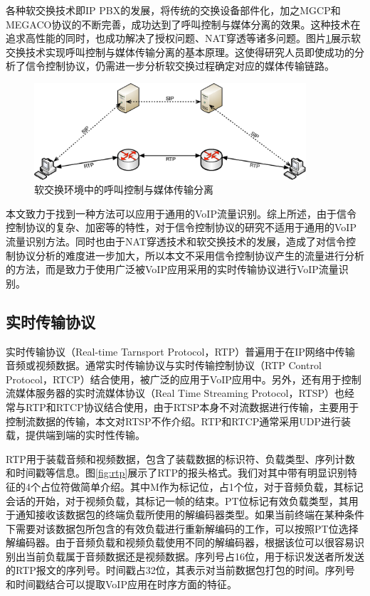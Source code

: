 各种软交换技术即IP PBX的发展，将传统的交换设备部件化，加之MGCP和MEGACO协议的不断完善，成功达到了呼叫控制与媒体分离的效果。这种技术在追求高性能的同时，也成功解决了授权问题、NAT穿透等诸多问题。图片\ref{fig:softswitch}展示软交换技术实现呼叫控制与媒体传输分离的基本原理。这使得研究人员即使成功的分析了信令控制协议，仍需进一步分析软交换过程确定对应的媒体传输链路。
\begin{figure}[thb]
\begin{center}
\includegraphics[width=0.9\textwidth]{figures/softswitch.eps}
\caption{软交换环境中的呼叫控制与媒体传输分离}\label{fig:softswitch}
\end{center}
\end{figure}

本文致力于找到一种方法可以应用于通用的VoIP流量识别。综上所述，由于信令控制协议的复杂、加密等的特性，对于信令控制协议的研究不适用于通用的VoIP流量识别方法。同时也由于NAT穿透技术和软交换技术的发展，造成了对信令控制协议分析的难度进一步加大，所以本文不采用信令控制协议产生的流量进行分析的方法，而是致力于使用广泛被VoIP应用采用的实时传输协议进行VoIP流量识别。

\subsection{实时传输协议}
实时传输协议（Real-time Tarnsport Protocol，RTP）普遍用于在IP网络中传输音频或视频数据。通常实时传输协议与实时传输控制协议（RTP Control Protocol，RTCP）结合使用，被广泛的应用于VoIP应用中。另外，还有用于控制流媒体服务器的实时流媒体协议（Real Time Streaming Protocol，RTSP）也经常与RTP和RTCP协议结合使用，由于RTSP本身不对流数据进行传输，主要用于控制流数据的传输，本文对RTSP不作介绍。RTP和RTCP通常采用UDP进行装载，提供端到端的实时性传输。

RTP用于装载音频和视频数据，包含了装载数据的标识符、负载类型、序列计数和时间戳等信息。图\ref{fig:rtp}展示了RTP的报头格式。我们对其中带有明显识别特征的4个占位符做简单介绍。其中M作为标记位，占1个位，对于音频负载，其标记会话的开始，对于视频负载，其标记一帧的结束。PT位标记有效负载类型，其用于通知接收该数据包的终端负载所使用的解编码器类型。如果当前终端在某种条件下需要对该数据包所包含的有效负载进行重新解编码的工作，可以按照PT位选择解编码器。由于音频负载和视频负载使用不同的解编码器，根据该位可以很容易识别出当前负载属于音频数据还是视频数据。序列号占16位，用于标识发送者所发送的RTP报文的序列号。时间戳占32位，其表示对当前数据包打包的时间。序列号和时间戳结合可以提取VoIP应用在时序方面的特征。

